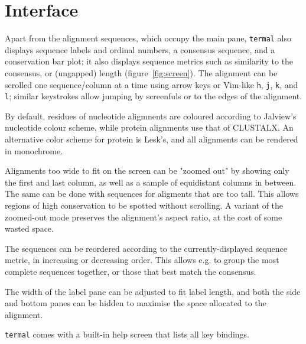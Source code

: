 \documentclass[11pt]{article}
\begin{document}
\section*{Interface}

Apart from the alignment sequences, which occupy the main pane, \texttt{termal}
also displays sequence labels and  ordinal numbers, a consensus sequence, and a
conservation bar plot; it also displays sequence metrics such as similarity to
the consensus, or (ungapped) length (figure~\ref{fig:screen}). The alignment can
be scrolled one sequence/column at a time using arrow keys or Vim-like
\texttt{h}, \texttt{j}, \texttt{k}, and \texttt{l}; similar keystrokes allow
jumping by screenfuls or to the edges of the alignment.

By default, residues of nucleotide aligmnents are coloured according to
Jalview's\cite{waterhouse2009jalview} nucleotide colour scheme, while protein
alignments use that of CLUSTALX\cite{larkin2007clustal}. An alternative color
scheme for protein is Lesk's\cite{lesk2019introduction}, and all alignments can
be rendered in monochrome. 

Alignments too wide to fit on the screen can be "zoomed out" by showing only the
first and last column, as well as a sample of equidistant columns in between.
The same can be done with sequences for aligments that are too tall. This
allows regions of high conservation to be spotted without scrolling. A variant
of the zoomed-out mode preserves the alignment's aspect ratio, at the cost of
some wasted space.

The sequences can be reordered according to the currently-displayed sequence
metric, in increasing or decreasing order. This allows e.g. to group the most
complete sequences together, or those that best match the consensus.

The width of the label pane can be adjusted to fit label length, and both the
side and bottom panes can be hidden to maximise the space allocated to the
alignment.

\texttt{termal} comes with a built-in help screen that lists all key bindings.
\end{document}
